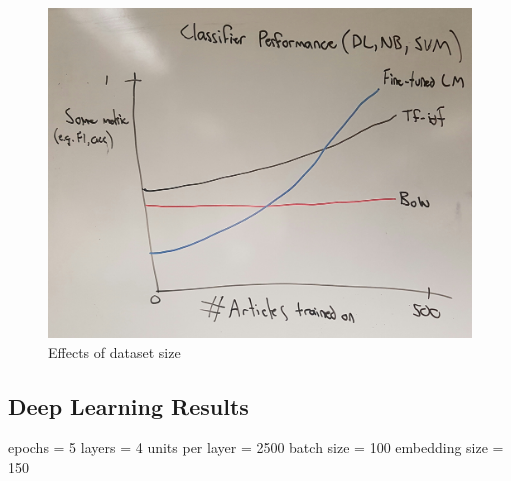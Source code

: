 \documentclass[a4paper,twoside,phd]{BYUPhys}
\begin{document}
\begin{figure}[H]
	\centering
	\includegraphics[totalheight=6cm]{images/classifier-performance-figure-draft.jpg}
	\caption{Effects of dataset size }
	\label{fig:AccruracyFig}
\end{figure}

\subsection{Deep Learning Results}
\label{sec:DLModelPerformanceResults}

epochs = 5 \newline
layers = 4 \newline
units per layer = 2500 \newline
batch size = 100 \newline
embedding size = 150 \newline
\end{document}
